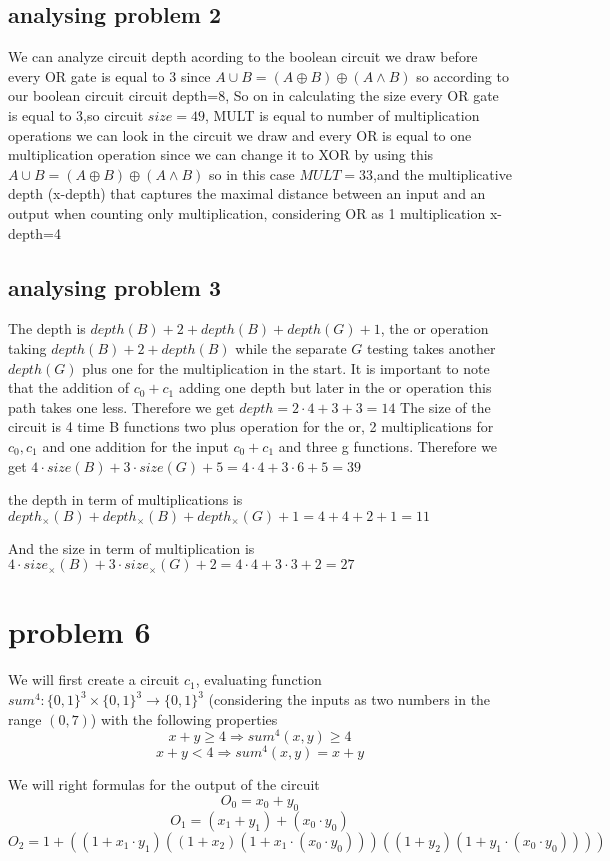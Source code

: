 \documentclass[11pt]{article}
\begin{document}
\subsection{analysing problem 2}
We can analyze circuit depth acording to the boolean circuit we draw before every OR gate is equal to 3 since $  A\cup B=(A\oplus B) \oplus (A\wedge B)$ so according to our boolean circuit circuit depth=8, So on in calculating the size every OR gate is equal to 3,so circuit $size=49$, MULT is equal to number of multiplication operations we can look in the circuit we draw and every OR is equal to one multiplication operation since we can change it to XOR by using this $  A\cup  B=(A\oplus B) \oplus (A\wedge B)$ so in this case $MULT=33$,and the multiplicative depth (x-depth) that captures
the maximal distance between an input and an output when counting only multiplication, considering OR as 1 multiplication x-depth=4
\subsection{analysing problem 3}
The depth is $depth(B)+2+depth(B)+depth(G)+1$, the or operation taking $depth(B)+2+depth(B)$ while the separate $G$ testing takes another $depth(G)$ plus one for the multiplication in the start.
It is important to note that the addition of $c_0+c_1$ adding one depth but later in the or operation this path takes one less. Therefore we get $depth = 2\cdot 4 + 3 + 3 = 14$
The size of the circuit is 4 time B functions two plus operation for the or, 2 multiplications for $c_0,c_1$ and one addition for the input $c_0+c_1$ and three g functions. Therefore we get $4\cdot size(B) + 3\cdot size(G) + 5 = 4 \cdot 4 + 3\cdot 6 + 5 = 39$

the depth in term of multiplications is $depth_{\times}(B)+depth_{\times}(B)+depth_{\times}(G)+1 = 4+4+2+1 = 11$

And the size in term of multiplication is $4\cdot size_{\times}(B) + 3\cdot size_{\times}(G) + 2 = 4\cdot4 + 3\cdot3 + 2 = 27$
\section*{problem 6}
We will first create a circuit $c_1$, evaluating function $sum^{4}:\{0,1\}^3 \times \{0,1\}^3 \to \{0,1\}^3$ (considering the inputs as two numbers in the range $(0,7)$) with the following properties
\[
x+y \geq 4 \Rightarrow sum^{4}(x,y) \geq 4 \]\[
x+y < 4 \Rightarrow  sum^{4}(x,y) = x+y
\]

We will right formulas for the output of the circuit 
\[O_0 = x_0 + y_0\]
\[O_1 = (x_1 + y_1) + (x_0 \cdot y_0)\]
\[O_2 = 1+((1+x_1\cdot y_1)((1+x_2)(1+ x_1\cdot (x_0 \cdot y_0)))((1+y_2)(1+y_1\cdot (x_0 \cdot y_0))))\]
\end{document}
